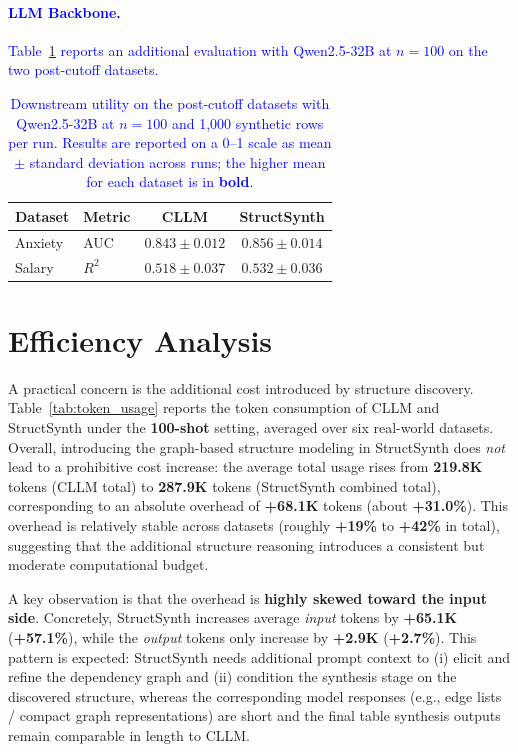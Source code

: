 \paragraph{\textcolor{blue}{LLM Backbone.}}
\textcolor{blue}{Table~\ref{tab:qwen25_post_cutoff} reports an additional evaluation with Qwen2.5-32B at $n=100$ on the two post-cutoff datasets.}

\begin{table}[t]
\centering
\small
\setlength{\tabcolsep}{4pt}
{\color{blue}
\begin{tabular}{llcc}
\toprule
\textbf{Dataset} & \textbf{Metric} & \textbf{CLLM} & \textbf{StructSynth} \\
\midrule
Anxiety & AUC   & $0.843 \pm 0.012$ & $\mathbf{0.856} \pm 0.014$ \\
Salary  & $R^2$ & $0.518 \pm 0.037$ & $\mathbf{0.532} \pm 0.036$ \\
\bottomrule
\end{tabular}
}
\caption{\textcolor{blue}{Downstream utility on the post-cutoff datasets with Qwen2.5-32B at $n=100$ and 1,000 synthetic rows per run. Results are reported on a 0--1 scale as mean $\pm$ standard deviation across runs; the higher mean for each dataset is in \textbf{bold}.}}
\label{tab:qwen25_post_cutoff}
\end{table}

\section{Efficiency Analysis}
\label{sec:token_usage}

A practical concern is the additional cost introduced by structure discovery. Table~\ref{tab:token_usage} reports the token consumption of \textsc{CLLM} and \textsf{StructSynth} under the \textbf{100-shot} setting, averaged over six real-world datasets. Overall, introducing the graph-based structure modeling in \textsf{StructSynth} does \emph{not} lead to a prohibitive cost increase: the average total usage rises from \textbf{219.8K} tokens (\textsc{CLLM} total) to \textbf{287.9K} tokens (\textsf{StructSynth} combined total), corresponding to an absolute overhead of \textbf{+68.1K} tokens (about \textbf{+31.0\%}). This overhead is relatively stable across datasets (roughly \textbf{+19\%} to \textbf{+42\%} in total), suggesting that the additional structure reasoning introduces a consistent but moderate computational budget.

A key observation is that the overhead is \textbf{highly skewed toward the input side}. Concretely, \textsf{StructSynth} increases average \emph{input} tokens by \textbf{+65.1K} (\textbf{+57.1\%}), while the \emph{output} tokens only increase by \textbf{+2.9K} (\textbf{+2.7\%}). This pattern is expected: \textsf{StructSynth} needs additional prompt context to (i) elicit and refine the dependency graph and (ii) condition the synthesis stage on the discovered structure, whereas the corresponding model responses (e.g., edge lists / compact graph representations) are short and the final table synthesis outputs remain comparable in length to \textsc{CLLM}.

